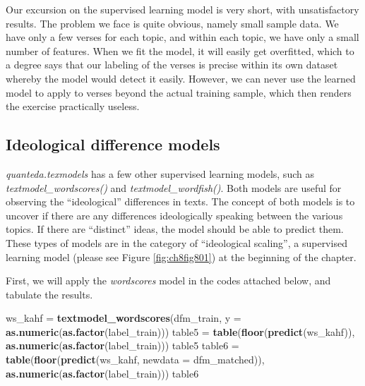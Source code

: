\documentclass[
]{article}
\newenvironment{Shaded}{\begin{snugshade}}{\end{snugshade}}
\newcommand{\AttributeTok}[1]{\textcolor[rgb]{0.13,0.29,0.53}{#1}}
\newcommand{\FunctionTok}[1]{\textcolor[rgb]{0.13,0.29,0.53}{\textbf{#1}}}
\newcommand{\NormalTok}[1]{#1}
\newcommand{\OtherTok}[1]{\textcolor[rgb]{0.56,0.35,0.01}{#1}}
\begin{document}
Our excursion on the supervised learning model is very short, with unsatisfactory results. The problem we face is quite obvious, namely small sample data. We have only a few verses for each topic, and within each topic, we have only a small number of features. When we fit the model, it will easily get overfitted, which to a degree says that our labeling of the verses is precise within its own dataset whereby the model would detect it easily. However, we can never use the learned model to apply to verses beyond the actual training sample, which then renders the exercise practically useless.

\hypertarget{ideological-difference-models}{%
\subsection{Ideological difference models}\label{ideological-difference-models}}

\emph{quanteda.texmodels} has a few other supervised learning models, such as \emph{textmodel\_wordscores()} and \emph{textmodel\_wordfish()}. Both models are useful for observing the ``ideological'' differences in texts. The concept of both models is to uncover if there are any differences ideologically speaking between the various topics. If there are ``distinct'' ideas, the model should be able to predict them. These types of models are in the category of ``ideological scaling'', a supervised learning model (please see Figure \ref{fig:ch8fig801}) at the beginning of the chapter.

First, we will apply the \emph{wordscores} model in the codes attached below, and tabulate the results.

\footnotesize

\begin{Shaded}
\begin{Highlighting}[]
\NormalTok{ws\_kahf }\OtherTok{=} \FunctionTok{textmodel\_wordscores}\NormalTok{(dfm\_train,}
                               \AttributeTok{y =} \FunctionTok{as.numeric}\NormalTok{(}\FunctionTok{as.factor}\NormalTok{(label\_train)))}
\NormalTok{table5 }\OtherTok{=} \FunctionTok{table}\NormalTok{(}\FunctionTok{floor}\NormalTok{(}\FunctionTok{predict}\NormalTok{(ws\_kahf)),}
               \FunctionTok{as.numeric}\NormalTok{(}\FunctionTok{as.factor}\NormalTok{(label\_train)))}
\NormalTok{table5}
\NormalTok{table6 }\OtherTok{=} \FunctionTok{table}\NormalTok{(}\FunctionTok{floor}\NormalTok{(}\FunctionTok{predict}\NormalTok{(ws\_kahf, }\AttributeTok{newdata =}\NormalTok{ dfm\_matched)), }
               \FunctionTok{as.numeric}\NormalTok{(}\FunctionTok{as.factor}\NormalTok{(label\_train)))}
\NormalTok{table6}
\end{Highlighting}
\end{Shaded}
\end{document}
